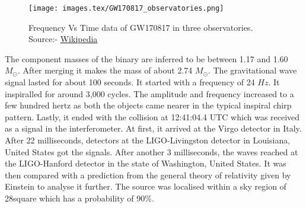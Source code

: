 \begin{figure}[h]
    \centering
    \texttt{[image: images.tex/GW170817\_observatories.png]}
    \caption{Frequency Vs Time data of GW170817 in three observatories. Source:- \href{https://en.wikipedia.org/wiki/GW170817}{Wikipedia}}
\end{figure}

The component masses of the binary are inferred to be between 1.17 and 1.60 $M_\odot$. After merging it makes the mass of about 2.74 $M_\odot$. The gravitational wave signal lasted for about 100 seconds. It started with a frequency of 24 $Hz$. It  inspiralled for around 3,000 cycles. The amplitude and frequency increased to a few hundred hertz as both the objects came nearer in the typical inspiral chirp pattern. Lastly, it ended with the collision at 12:41:04.4 UTC which was received as a signal in the interferometer. At first, it arrived at the Virgo detector in Italy. After 22 milliseconds, detectors at the LIGO-Livingston detector in Louisiana, United States got the signals. After another 3 milliseconds, the waves reached at the LIGO-Hanford detector in the state of Washington, United States. It was then compared with a prediction from the general theory of relativity given by Einstein to analyse it further. The source was localised within a sky region of 28\degree square which has a probability of 90\%.

